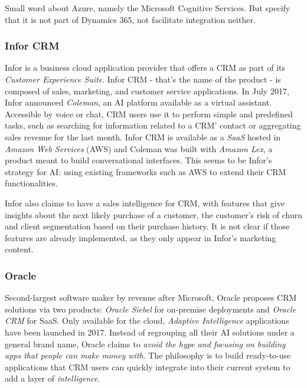 Small word about Azure, namely the Microsoft Cognitive Services. But specify that it is not part of Dynamics 365, not facilitate integration neither.

\subsubsection*{Infor CRM}
Infor is a business cloud application provider that offers a CRM as part of its \textit{Customer Experience Suite}. Infor CRM - that's the name of the product - is composed of sales, marketing, and customer service applications. In July 2017, Infor announced \textit{Coleman}, an AI platform available as a virtual assistant. Accessible by voice or chat, CRM users use it to perform simple and predefined tasks, such as searching for information related to a CRM' contact or aggregating sales revenue for the last month. Infor CRM is available as a \textit{SaaS} hosted in \textit{Amazon Web Services} (AWS) and Coleman was built with \textit{Amazon Lex}, a product meant to build conversational interfaces. This seems to be Infor's strategy for AI: using existing frameworks such as AWS to extend their CRM functionalities.

Infor also claims to have a sales intelligence for CRM, with features that give insights about the next likely purchase of a customer, the customer's risk of churn and client segmentation based on their purchase history. It is not clear if those features are already implemented, as they only appear in Infor's marketing content.\nocite{infor-website}


\subsubsection*{Oracle}
Second-largest software maker by revenue after Microsoft, Oracle proposes CRM solutions via two products: \textit{Oracle Siebel} for on-premise deployments and \textit{Oracle CRM} for SaaS. Only available for the cloud, \textit{Adaptive Intelligence} applications have been launched in 2017. Instead of regrouping all their AI solutions under a general brand name, Oracle claims to \textit{avoid the hype and focusing on building apps that people can make money with}\cite{https://www.techemergence.com/crm-artificial-intelligence-trends-across-salesforce-oracle-sap/}. The philosophy is to build ready-to-use applications that CRM users can quickly integrate into their current system to add a layer of \textit{intelligence}.

